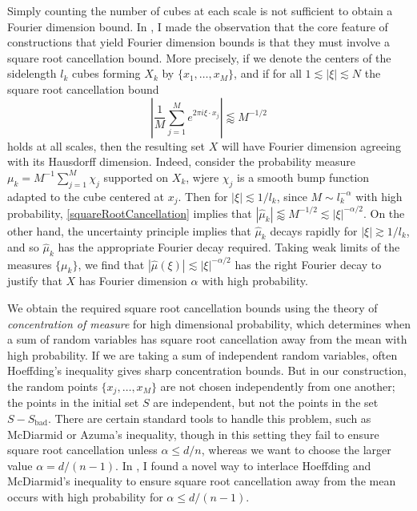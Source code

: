 \documentclass[11pt]{article}
\begin{document}
Simply counting the number of cubes at each scale is not sufficient to obtain a Fourier dimension bound. In \cite{DensonFourier}, I made the observation that the core feature of constructions that yield Fourier dimension bounds is that they must involve a square root cancellation bound. More precisely, if we denote the centers of the sidelength $l_k$ cubes forming $X_k$ by $\{ x_1,\dots,x_M \}$, and if for all $1 \lesssim |\xi| \lesssim N$ the square root cancellation bound
%
\begin{equation} \label{squareRootCancellation}
	\left| \frac{1}{M} \sum_{j = 1}^M e^{2 \pi i \xi \cdot x_j} \right| \lessapprox M^{-1/2}
\end{equation}
%
holds at all scales, then the resulting set $X$ will have Fourier dimension agreeing with its Hausdorff dimension. Indeed, consider the probability measure $\mu_k = M^{-1} \sum_{j = 1}^M \chi_j$ supported on $X_k$, wjere $\chi_j$ is a smooth bump function adapted to the cube centered at $x_j$. Then for $|\xi| \lesssim 1/l_k$, since $M \sim l_k^{-\alpha}$ with high probability, \eqref{squareRootCancellation} implies that $|\widehat{\mu}_k| \lessapprox M^{-1/2} \lesssim |\xi|^{-\alpha/2}$. On the other hand, the uncertainty principle implies that $\widehat{\mu}_k$ decays rapidly for $|\xi| \gtrsim 1/l_k$, and so $\widehat{\mu}_k$ has the appropriate Fourier decay required. Taking weak limits of the measures $\{ \mu_k \}$, we find that $|\widehat{\mu}(\xi)| \lesssim |\xi|^{-\alpha/2}$ has the right Fourier decay to justify that $X$ has Fourier dimension $\alpha$ with high probability.

We obtain the required square root cancellation bounds using the theory of \emph{concentration of measure} for high dimensional probability, which determines when a sum of random variables has square root cancellation away from the mean with high probability. If we are taking a sum of independent random variables, often Hoeffding's inequality gives sharp concentration bounds. But in our construction, the random points $\{ x_j, \dots, x_M \}$ are not chosen independently from one another; the points in the initial set $S$ are independent, but not the points in the set $S - S_{\text{bad}}$. There are certain standard tools to handle this problem, such as McDiarmid or Azuma's inequality, though in this setting they fail to ensure square root cancellation unless $\alpha \leq d/n$, whereas we want to choose the larger value $\alpha = d/(n-1)$. In \cite{DensonFourier}, I found a novel way to interlace Hoeffding and McDiarmid's inequality to ensure square root cancellation away from the mean occurs with high probability for $\alpha \leq d/(n-1)$.
\end{document}
